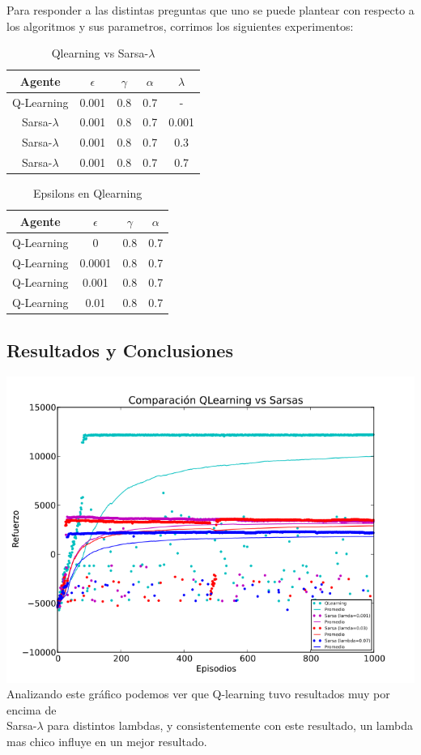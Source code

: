 \documentclass[11pt, a4paper]{article}
\newcommand{\slambda}{Sarsa-$\lambda$ }
\begin{document}
Para responder a las distintas preguntas que uno se puede plantear con respecto a los algoritmos y sus parametros, corrimos los siguientes experimentos:

\bigskip

\begin{table}[h]
\center
\begin{tabular}{ | c | c | c | c | c| }
  \hline
  Agente & $\epsilon$ & $\gamma$ & $\alpha$ & $\lambda$ \\
  \hline 
 	 Q-Learning  & 0.001  & 0.8  & 0.7 & - \\
	\slambda & 0.001  & 0.8  & 0.7 & 0.001 \\
	\slambda & 0.001  & 0.8  & 0.7 & 0.3 \\
	\slambda  & 0.001  & 0.8  & 0.7 & 0.7\\
  \hline

\end{tabular}

\caption {Qlearning vs \slambda}
\end{table}
\begin{table}[h]
\center
\begin{tabular}{ | c | c | c | c | }
  \hline
  Agente & $\epsilon$ & $\gamma$ & $\alpha$ \\
  \hline 
 	 Q-Learning  & 0  & 0.8  & 0.7 \\
	 Q-Learning  & 0.0001  & 0.8  & 0.7 \\
	 Q-Learning  & 0.001  & 0.8  & 0.7 \\
	 Q-Learning  & 0.01  & 0.8  & 0.7 \\
  \hline
\end{tabular}
\caption {Epsilons en Qlearning}
\end{table}

\newpage

\subsection{Resultados y Conclusiones}
\includegraphics[scale=0.6]{Graf1}
Analizando este gr\'afico podemos ver que Q-learning tuvo resultados muy por encima de\\ \slambda para distintos lambdas, y consistentemente con este resultado, un lambda mas chico influye en un mejor resultado.
\end{document}
